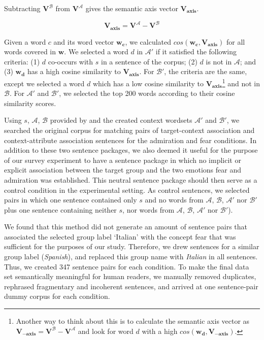 Subtracting $\mathbf{V}^{\mathcal{B}}$ from $\mathbf{V}^{\mathcal{A}}$ gives the semantic axis vector $\mathbf{V_{axis}}$. 


\begin{equation}
\mathbf{V_{axis}} = \mathbf{V}^{\mathcal{A}} - \mathbf{V}^{\mathcal{B}}
\end{equation}

Given a word $c$ and its word vector $\boldsymbol{w_c}$, we calculated $cos(\boldsymbol{w_c}, \mathbf{V_{axis}})$ for all words covered in $\boldsymbol{w}$. We selected a word $d$ in $\mathcal{A'}$ if it satisfied the following criteria: (1) $d$ co-occurs with $s$ in a sentence of the corpus; (2) $d$ is not in $\mathcal{A}$; and (3) $\boldsymbol{w_d}$ has a high cosine similarity to $\mathbf{V_{axis}}$. For $\mathcal{B'}$, the criteria are the same, except we selected a word $d$ which has a low cosine similarity to $\mathbf{V_{axis}}$\footnote{Another way to think about this is to calculate the semantic axis vector as $\mathbf{V_{-axis}} = \mathbf{V}^{\mathcal{B}} - \mathbf{V}^{\mathcal{A}}$ and look for word $d$ with a high $cos(\boldsymbol{w_d}, \mathbf{V_{-axis}})$.} and not in $\mathcal{B}$. For $\mathcal{A'}$ and $\mathcal{B'}$, we selected the top 200 words according to their cosine similarity scores.

Using $s$, $\mathcal{A}$, $\mathcal{B}$ provided by \textcite{mueller:2023:DRN} and the created context wordsets $\mathcal{A'}$ and $\mathcal{B'}$, we searched the original corpus for matching pairs of target-context association and context-attribute association sentences for the admiration and fear conditions. In addition to these two sentence packages, we also deemed it useful for the purpose of our survey experiment to have a sentence package in which no implicit or explicit association between the target group and the two emotions fear and admiration was established. This neutral sentence package should then serve as a control condition in the experimental setting. As control sentences, we selected pairs in which one sentence contained only $s$ and no words from $\mathcal{A}$, $\mathcal{B}$, $\mathcal{A'}$ nor $\mathcal{B'}$ plus one sentence containing neither $s$, nor words from $\mathcal{A}$, $\mathcal{B}$, $\mathcal{A'}$ nor $\mathcal{B'}$).
 
We found that this method did not generate an amount of sentence pairs that associated the selected group label `Italian' with the concept fear that was sufficient for the purposes of our study. Therefore, we drew sentences for a similar group label (\textit{Spanish}), and replaced this group name with \textit{Italian} in all sentences. Thus, we created 347 sentence pairs for each condition. To make the final data set semantically meaningful for human readers, we manually removed duplicates, rephrased fragmentary and incoherent sentences, and arrived at one sentence-pair dummy corpus for each condition.

